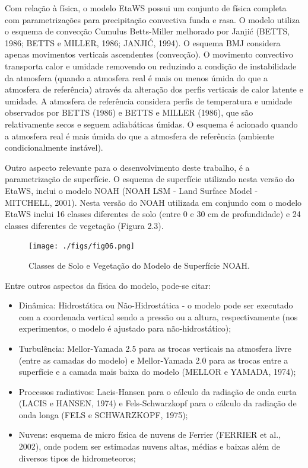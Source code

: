 Com relação à física, o modelo EtaWS possui um conjunto de física completa com parametrizações para precipitação convectiva funda e rasa. O modelo utiliza o esquema de convecção Cumulus Betts-Miller melhorado por Janji\'{c} (BETTS, 1986; BETTS e MILLER, 1986; JANJI\'{C}, 1994). O esquema BMJ considera apenas movimentos verticais ascendentes (convecção). O movimento convectivo transporta calor e umidade removendo ou reduzindo a condição de instabilidade da atmosfera (quando a atmosfera real é mais ou menos úmida do que a atmosfera de referência) através da alteração dos perfis verticais de calor latente e umidade. A atmosfera de referência considera perfis de temperatura e umidade observados por BETTS (1986) e BETTS e MILLER (1986), que são relativamente secos e seguem adiabáticas úmidas. O esquema é acionado quando a atmosfera real é mais úmida do que a atmosfera de referência (ambiente condicionalmente instável).

Outro aspecto relevante para o desenvolvimento deste trabalho, é a parametrização de superfície. O esquema de superfície utilizado nesta versão do EtaWS, inclui o modelo NOAH (NOAH LSM - Land Surface Model - MITCHELL, 2001). Nesta versão do NOAH utilizada em conjundo com o modelo EtaWS inclui 16 classes diferentes de solo (entre 0 e 30 cm de profundidade) e 24 classes diferentes de vegetação (Figura 2.3).

\begin{figure}
\centering
\texttt{[image: ./figs/fig06.png]}
\caption{Classes de Solo e Vegetação do Modelo de Superfície NOAH.}
\label{fig06}
\end{figure}

Entre outros aspectos da física do modelo, pode-se citar:

\begin{itemize}
\item Dinâmica: Hidrostática ou Não-Hidrostática - o modelo pode ser executado com a coordenada vertical sendo a pressão ou a altura, respectivamente (nos experimentos, o modelo é ajustado para não-hidrostático);
\item Turbulência: Mellor-Yamada 2.5 para as trocas verticais na atmosfera livre (entre as camadas do modelo) e Mellor-Yamada 2.0 para as trocas entre a superfície e a camada mais baixa do modelo (MELLOR e YAMADA, 1974);
\item Processos radiativos: Lacis-Hansen para o cálculo da radiação de onda curta (LACIS e HANSEN, 1974) e Fels-Schwarzkopf para o cálculo da radiação de onda longa (FELS e SCHWARZKOPF, 1975);
\item Nuvens: esquema de micro física de nuvens de Ferrier (FERRIER et al., 2002), onde podem ser estimadas nuvens altas, médias e baixas além de diversos tipos de hidrometeoros;
\end{itemize}

